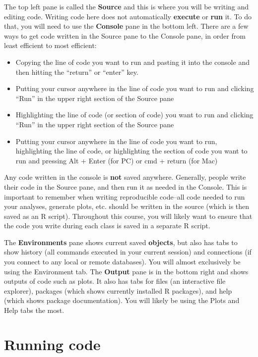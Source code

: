 \documentclass[
  letterpaper,
  DIV=11,
  numbers=noendperiod]{scrreprt}
\begin{document}
The top left pane is called the \textbf{Source} and this is where you
will be writing and editing code. Writing code here does not
automatically \textbf{execute} or \textbf{run} it. To do that, you will
need to use the \textbf{Console} pane in the bottom left. There are a
few ways to get code written in the Source pane to the Console pane, in
order from least efficient to most efficient:

\begin{itemize}
\item
  Copying the line of code you want to run and pasting it into the
  console and then hitting the ``return'' or ``enter'' key.
\item
  Putting your cursor anywhere in the line of code you want to run and
  clicking ``Run'' in the upper right section of the Source pane
\item
  Highlighting the line of code (or section of code) you want to run and
  clicking ``Run'' in the upper right section of the Source pane
\item
  Putting your cursor anywhere in the line of code you want to run,
  highlighting the line of code, or highlighting the section of code you
  want to run and pressing Alt + Enter (for PC) or cmd + return (for
  Mac)
\end{itemize}

Any code written in the console is \textbf{not} saved anywhere.
Generally, people write their code in the Source pane, and then run it
as needed in the Console. This is important to remember when writing
reproducible code--all code needed to run your analyses, generate plots,
etc. should be written in the source (which is then saved as an R
script). Throughout this course, you will likely want to ensure that the
code you write during each class is saved in a separate R script.

The \textbf{Environments} pane shows current saved \textbf{objects}, but
also has tabs to show history (all commands executed in your current
session) and connections (if you connect to any local or remote
databases). You will almost exclusively be using the Environment tab.
The \textbf{Output} pane is in the bottom right and shows outputs of
code such as plots. It also has tabs for files (an interactive file
explorer), packages (which shows currently installed R packages), and
help (which shows package documentation). You will likely be using the
Plots and Help tabs the most.

\section{Running code}\label{running-code}
\end{document}
